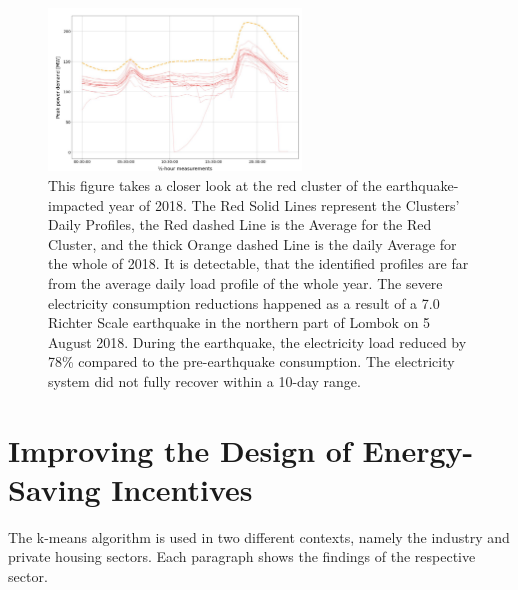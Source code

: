 \begin{figure}[H]
    \centering
    \includegraphics[width=0.6\textwidth]{figures/jessen_ndImpactedClusters/jessen_ClusterTwo2018.png}
    \caption{This figure takes a closer look at the red cluster of the earthquake-impacted year of 2018.
    The Red Solid Lines represent the Clusters' Daily Profiles, the Red dashed Line is the Average for the Red Cluster, and the thick Orange dashed Line is the daily Average for the whole of 2018.
    It is detectable, that the identified profiles are far from the average daily load profile of the whole year.
    The severe electricity consumption reductions happened as a result of a 7.0 Richter Scale earthquake in the northern part of Lombok on 5 August 2018.
    During the earthquake, the electricity load reduced by 78\% compared to the pre-earthquake consumption.
    The electricity system did not fully recover within a 10-day range.
    }
    \label{fig:clustering_results_2018_cluster_two}
\end{figure}

\section{Improving the Design of Energy-Saving Incentives}
\label{sec:improving_the_design_of_energy_saving_incentives}
The k-means algorithm is used in two different contexts, namely the industry and private housing sectors.
Each paragraph shows the findings of the respective sector.


